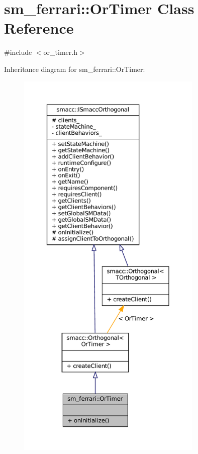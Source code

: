\hypertarget{classsm__ferrari_1_1OrTimer}{}\section{sm\+\_\+ferrari\+:\+:Or\+Timer Class Reference}
\label{classsm__ferrari_1_1OrTimer}


{\ttfamily \#include $<$or\+\_\+timer.\+h$>$}



Inheritance diagram for sm\+\_\+ferrari\+:\+:Or\+Timer\+:
\nopagebreak
\begin{figure}[H]
\begin{center}
\leavevmode
\includegraphics[height=550pt]{classsm__ferrari_1_1OrTimer__inherit__graph}
\end{center}
\end{figure}


